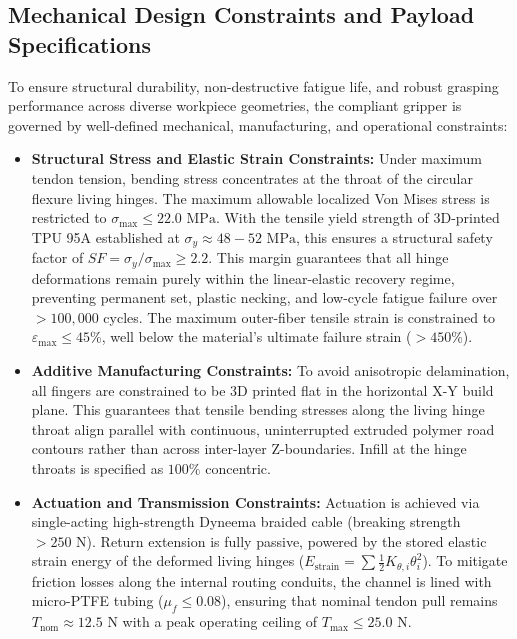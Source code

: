 \documentclass[12pt,a4paper]{report}
\begin{document}
\subsection{Mechanical Design Constraints and Payload Specifications}
To ensure structural durability, non-destructive fatigue life, and robust grasping performance across diverse workpiece geometries, the compliant gripper is governed by well-defined mechanical, manufacturing, and operational constraints:
\begin{itemize}
    \item \textbf{Structural Stress and Elastic Strain Constraints:} Under maximum tendon tension, bending stress concentrates at the throat of the circular flexure living hinges. The maximum allowable localized Von Mises stress is restricted to $\sigma_{\text{max}} \le 22.0\text{ MPa}$. With the tensile yield strength of 3D-printed TPU 95A established at $\sigma_y \approx 48 - 52\text{ MPa}$, this ensures a structural safety factor of $SF = \sigma_y / \sigma_{\text{max}} \ge 2.2$. This margin guarantees that all hinge deformations remain purely within the linear-elastic recovery regime, preventing permanent set, plastic necking, and low-cycle fatigue failure over $>100,000$ cycles. The maximum outer-fiber tensile strain is constrained to $\varepsilon_{\text{max}} \le 45\%$, well below the material's ultimate failure strain ($>450\%$).
    \item \textbf{Additive Manufacturing Constraints:} To avoid anisotropic delamination, all fingers are constrained to be 3D printed flat in the horizontal X-Y build plane. This guarantees that tensile bending stresses along the living hinge throat align parallel with continuous, uninterrupted extruded polymer road contours rather than across inter-layer Z-boundaries. Infill at the hinge throats is specified as $100\%$ concentric.
    \item \textbf{Actuation and Transmission Constraints:} Actuation is achieved via single-acting high-strength Dyneema braided cable (breaking strength $>250\text{ N}$). Return extension is fully passive, powered by the stored elastic strain energy of the deformed living hinges ($E_{\text{strain}} = \sum \frac{1}{2} K_{\theta, i} \theta_i^2$). To mitigate friction losses along the internal routing conduits, the channel is lined with micro-PTFE tubing ($\mu_f \le 0.08$), ensuring that nominal tendon pull remains $T_{\text{nom}} \approx 12.5\text{ N}$ with a peak operating ceiling of $T_{\text{max}} \le 25.0\text{ N}$.

\end{itemize}
\end{document}
